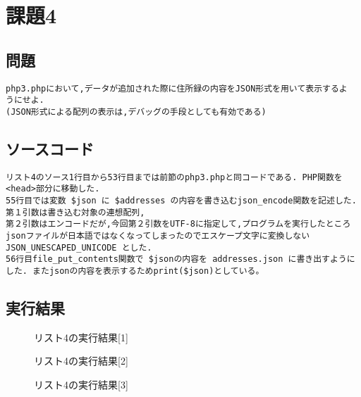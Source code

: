 \documentclass[a4j,10pt]{jsarticle}
\begin{document}
\section{課題4}

\subsection{問題}

\begin{verbatim}
php3.phpにおいて,データが追加された際に住所録の内容をJSON形式を用いて表示するよ
うにせよ.
(JSON形式による配列の表示は,デバッグの手段としても有効である)

\end{verbatim}
\subsection{ソースコード}


\begin{verbatim}
リスト4のソース1行目から53行目までは前節のphp3.phpと同コードである. PHP関数を<head>部分に移動した.
55行目では変数 $json に $addresses の内容を書き込むjson_encode関数を記述した. 第１引数は書き込む対象の連想配列,
第２引数はエンコードだが,今回第２引数をUTF-8に指定して,プログラムを実行したところjsonファイルが日本語ではなくなってしまったのでエスケープ文字に変換しないJSON_UNESCAPED_UNICODE とした.
56行目file_put_contents関数で $jsonの内容を addresses.json に書き出すようにした. またjsonの内容を表示するためprint($json)としている。

\end{verbatim}
\subsection{実行結果}

\begin{figure}[H]
  \centering
  \caption{リスト4の実行結果[1]}
\label{fig:fig5}
\end{figure}

\begin{figure}[H]
  \centering
  \caption{リスト4の実行結果[2]}
\label{fig:fig4}
\end{figure}

\begin{figure}[H]
  \centering
  \caption{リスト4の実行結果[3]}
\label{fig:fig6}
\end{figure}
\end{document}
